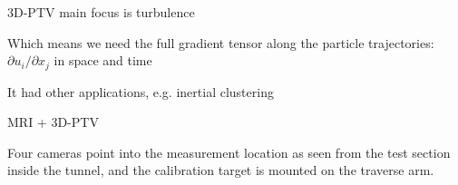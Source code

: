     
\begin{frame}[label=app-13]{3D-PTV main focus is turbulence}
    \begin{cardTiny} 
    Which means we need  the \alert{full gradient tensor} along the particle trajectories:
    $\partial u_{i}/\partial x_{j}$ in space and time
    \end{cardTiny}
    \begin{multicols}{2}
    \centering
    \end{multicols}
    \end{frame}
    
    \begin{frame}[label=app-14]{It had other applications, e.g. inertial clustering}
    \centering{}
    \end{frame}
    
    \begin{frame}[label=app-15]{MRI + 3D-PTV}
    \begin{multicols}{2}
    \centering
    \end{multicols}
    \centering{}
    \end{frame}
    
    
    \begin{frame}[label=iibr-2]
    \begin{multicols}{2}
    \centering
    \end{multicols}
    \begin{cardTiny}
    Four cameras point into the measurement location as seen from the test section inside the tunnel, and the calibration target is mounted on the traverse arm.
    \end{cardTiny}
    \end{frame}
    
    \begin{frame}[label=iibr-1]
    \begin{multicols}{2}
    \centering{}
    \end{multicols}
    \end{frame}
    
    
